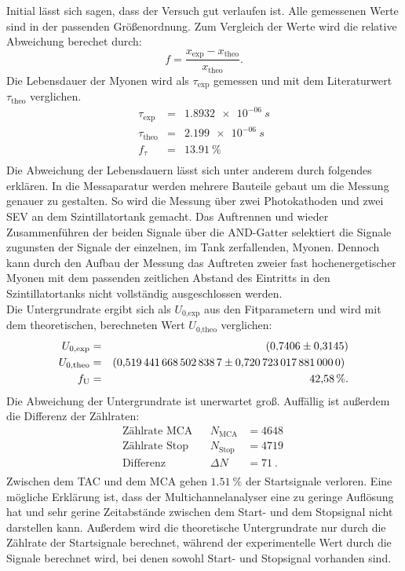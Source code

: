 Initial lässt sich sagen, dass der Versuch gut verlaufen ist.
Alle gemessenen Werte sind in der passenden Größenordnung.
Zum Vergleich der Werte wird die relative Abweichung berechet durch:
\begin{equation*}
  f=\frac{x_{\text{exp}}-x_{\text{theo}}}{x_{\text{theo}}}.
\end{equation*}
Die Lebensdauer der Myonen wird als $\tau_{\text{exp}}$ gemessen und mit dem Literaturwert $\tau_{\text{theo}}$ \cite{Demtröder} verglichen.
\begin{align*}
  \tau_{\text{exp}}   &=&   \SI{1.8932e-06}{s}  \\
  \tau_{\text{theo}}  &=&   \SI{2.199e-06}{s}   \\
  f_{\tau}            &=&   \SI{13.91}{\%}      \\
\end{align*}
Die Abweichung der Lebensdauern lässt sich unter anderem durch folgendes erklären.
In die Messaparatur werden mehrere Bauteile gebaut um die Messung genauer zu gestalten.
So wird die Messung über zwei Photokathoden und zwei SEV an dem Szintillatortank gemacht.
Das Auftrennen und wieder Zusammenführen der beiden Signale über die AND-Gatter selektiert die Signale zugunsten der Signale der einzelnen, im Tank zerfallenden, Myonen.
Dennoch kann durch den Aufbau der Messung das Auftreten zweier fast hochenergetischer Myonen mit dem passenden zeitlichen Abstand des Eintritts in den Szintillatortanks nicht vollständig ausgeschlossen werden.\\
Die Untergrundrate ergibt sich als $U_{\text{0,exp}}$ aus den Fitparametern und wird mit dem theoretischen, berechneten Wert $U_{\text{0,theo}}$ verglichen:
\begin{align*}
  U_{\text{0,exp}}    &=&  \SI{0.7406 \pm 0.3145}{} \\
  U_{\text{0,theo}}   &=&  \SI{0.5194416685028387 \pm 0.720723017881}{}   \\
  f_{\text{U}}        &=&  \SI{42.58}{\%}. \\
\end{align*}
Die Abweichung der Untergrundrate ist unerwartet groß.
Auffällig ist außerdem die Differenz der Zählraten:
\begin{align*}
  \text{Zählrate MCA}      && N_{\text{MCA}}    &=\SI{4648}{} \\
  \text{Zählrate Stop}     && N_{\text{Stop}}   &=\SI{4719}{} \\
  \text{Differenz}         && \Delta N          &=\SI{71}{}.\\
\end{align*}
Zwischen dem TAC und dem MCA gehen $\SI{1.51}{\%}$ der Startsignale verloren.
Eine mögliche Erklärung ist, dass der Multichannelanalyser eine zu geringe Auflösung hat und sehr gerine Zeitabstände zwischen dem Start- und dem Stopsignal nicht darstellen kann.
Außerdem wird die theoretische Untergrundrate nur durch die Zählrate der Startsignale berechnet, während der experimentelle Wert durch die Signale berechnet wird, bei denen sowohl Start- und Stopsignal vorhanden sind.
